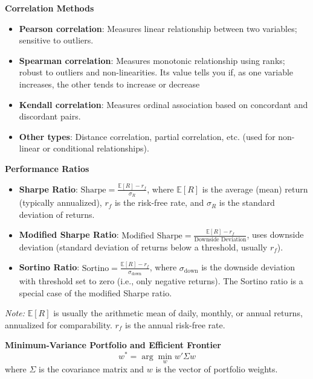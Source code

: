 \documentclass[12pt,a4paper]{article}
\begin{document}
\textbf{Correlation Methods}

\begin{itemize}
    \item \textbf{Pearson correlation}: Measures linear relationship between two variables; sensitive to outliers.
    \item \textbf{Spearman correlation}: Measures monotonic relationship using ranks; robust to outliers and non-linearities. Its value tells you if, as one variable increases, the other tends to increase or decrease
    \item \textbf{Kendall correlation}: Measures ordinal association based on concordant and discordant pairs.
    \item \textbf{Other types}: Distance correlation, partial correlation, etc. (used for non-linear or conditional relationships).
\end{itemize}

\vspace{1em}

\textbf{Performance Ratios}

\begin{itemize}
    \item \textbf{Sharpe Ratio}: $\displaystyle \text{Sharpe} = \frac{\mathbb{E}[R] - r_f}{\sigma_R}$, where $\mathbb{E}[R]$ is the average (mean) return (typically annualized), $r_f$ is the risk-free rate, and $\sigma_R$ is the standard deviation of returns.
    \item \textbf{Modified Sharpe Ratio}: $\displaystyle \text{Modified Sharpe} = \frac{\mathbb{E}[R] - r_f}{\text{Downside Deviation}}$, uses downside deviation (standard deviation of returns below a threshold, usually $r_f$).
    \item \textbf{Sortino Ratio}: $\displaystyle \text{Sortino} = \frac{\mathbb{E}[R] - r_f}{\sigma_{\text{down}}}$, where $\sigma_{\text{down}}$ is the downside deviation with threshold set to zero (i.e., only negative returns). The Sortino ratio is a special case of the modified Sharpe ratio.
    \end{itemize}

\vspace{0.5em}

\textit{Note:} $\mathbb{E}[R]$ is usually the arithmetic mean of daily, monthly, or annual returns, annualized for comparability. $r_f$ is the annual risk-free rate.


\textbf{Minimum-Variance Portfolio and Efficient Frontier}
\[
w^* = \arg\min_w w'\Sigma w
\]
where $\Sigma$ is the covariance matrix and $w$ is the vector of portfolio weights.
\end{document}
